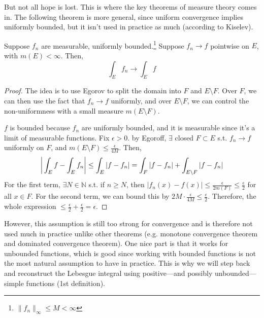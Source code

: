   But not all hope is lost. This is where the key theorems of measure theory comes in. The following theorem is more general, since uniform convergence implies uniformly bounded, but it isn't used in practice as much (according to Kiselev). 

  \begin{theorem}
    Suppose $f_n$ are measurable, uniformly bounded.\footnote{$\|f_n\|_\infty \leq M < \infty$} Suppose $f_n \to f$ pointwise on $E$, with $m(E) < \infty$. Then, 
    \begin{equation}
      \int_E f_n \to \int_E f
    \end{equation}
  \end{theorem}
  \begin{proof}
    The idea is to use Egorov to split the domain into $F$ and $E \setminus F$. Over $F$, we can then use the fact that $f_n \to f$ uniformly, and over $E \setminus F$, we can control the non-uniformness with a small measure $m(E \setminus F)$. 

    $f$ is bounded because $f_n$ are uniformly bounded, and it is measurable since it's a limit of measurable functions. Fix $\epsilon > 0$. by Egoroff, $\exists$ closed $F \subset E$ s.t. $f_n \to f$ uniformly on $F$, and $m(E \setminus F) \leq \frac{\epsilon}{4M}$. Then, 
    \begin{equation}
      \bigg| \int_E f - \int_E f_n \bigg| \leq \int_E |f - f_n| = \int_F |f - f_n| + \int_{E \setminus F} |f - f_n|  \\ 
    \end{equation}
    For the first term, $\exists N \in \mathbb{N}$ s.t. if $n \geq N$, then $|f_n (x) - f(x)| \leq \frac{\epsilon}{2 m(F)} \leq \frac{\epsilon}{2}$ for all $x \in F$. For the second term, we can bound this by $2M \cdot \frac{\epsilon}{4M} \leq \frac{\epsilon}{2}$. Therefore, the whole expression $\leq \frac{\epsilon}{2} + \frac{\epsilon}{2} = \epsilon$. 
  \end{proof}

  However, this assumption is still too strong for convergence and is therefore not used much in practice unlike other theorems (e.g. monotone convergence theorem and dominated convergence theorem). One nice part is that it works for unbounded functions, which is good since working with bounded functions is not the most natural assumption to have in practice. This is why we will step back and reconstruct the Lebesgue integral using positive---and possibly unbounded---simple functions (1st definition). 

